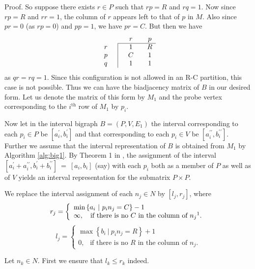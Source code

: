 \documentclass[secthm]{elsart}
\newcommand{\set}[1]{\left\{#1\right\}}
\newcommand{\Set}[2]{\set{#1\ \vert\ #2}}
\begin{document}
\begin{pf*}{Proof.}
So suppose there exists $r\in P$ such that $rp=R$ and $rq=1$. Now since $rp=R$ and $rr=1$, the column of $r$ appears left to that of $p$ in $M$. Also since $pr=0$ (as $rp=0$) and $pp=1$, we have $pr=C$. But then we have
$$\begin{array}{cc|cccc}
\multicolumn{3}{c}{} & r && p \\ \cline{3-6}
r &&& 1 && R \\
p &&& C && 1 \\
q &&& 1 && 1
\end{array}$$
as $qr=rq=1$. Since this configuration is not allowed in an R-C partition, this case is not possible. Thus we can have the biadjacency matrix of $B$ in our desired form. Let us denote the matrix of this form by $M_1$ and the probe vertex corresponding to the $i^\textrm{th}$ row of $M_1$ by $p_i$.

Now let in the interval bigraph $B=(P,V,E_1)$ the interval corresponding to each $p_i\in P$ be $[a_i^\prime,b_i^\prime]$ and that corresponding to each $p_i\in V$ be $[a_i^{\prime\prime},b_i^{\prime\prime}]$. Further we assume that the interval representation of $B$ is obtained from $M_1$ by Algorithm \ref{alg:big1}. By Theorem 1 in \cite{SSW}, the assignment of the interval $[a_i^\prime + a_i^{\prime\prime},b_i^\prime + b_i^{\prime\prime}]\ =\ [a_i,b_i]$ (say) with each $p_i$ both as a member of $P$ as well as of $V$ yields an interval representation for the submatrix $P\times P$.

We replace the interval assignment of each $n_j\in N$ by $[l_j,r_j]$, where
\begin{equation}\label{eq:rj}
r_j=\left\{\begin{array}{l}
\min \Set{a_i}{p_in_j=C} - 1\\
\infty,\ \ \textrm{ if there is no $C$ in the column of $n_j$\footnotemark .} 
\end{array}\right .
\end{equation}
\begin{equation}\label{eq:lj}
l_j=\left\{\begin{array}{l}
\max \Set{b_i}{p_in_j=R} + 1\\
0,\ \ \textrm{ if there is no $R$ in the column of $n_j$.}
\end{array}\right .
\end{equation}

Let $n_k\in N$. First we ensure that $l_k\leqslant r_k$ indeed. 


\end{pf*}
\end{document}

